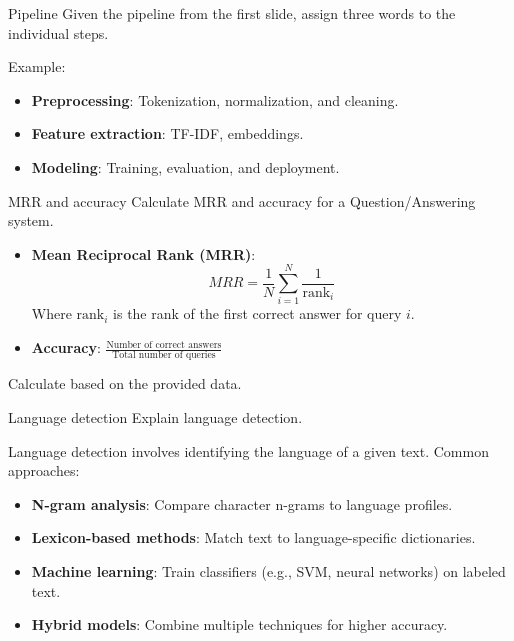 \documentclass{article}
\begin{document}
\begin{exercise}{Pipeline}
  Given the pipeline from the first slide, assign three words to the individual steps.

  \begin{solution}
    Example:
    \begin{itemize}
        \item \textbf{Preprocessing}: Tokenization, normalization, and cleaning.
        \item \textbf{Feature extraction}: TF-IDF, embeddings.
        \item \textbf{Modeling}: Training, evaluation, and deployment.
    \end{itemize}
  \end{solution}
\end{exercise}

\begin{exercise}{MRR and accuracy}
  Calculate MRR and accuracy for a Question/Answering system.

  \begin{solution}
    \begin{itemize}
        \item \textbf{Mean Reciprocal Rank (MRR)}:
        \[
        MRR = \frac{1}{N} \sum_{i=1}^{N} \frac{1}{\text{rank}_i}
        \]
        Where \(\text{rank}_i\) is the rank of the first correct answer for query \(i\).
        \item \textbf{Accuracy}: \(\frac{\text{Number of correct answers}}{\text{Total number of queries}}\)
    \end{itemize}
    Calculate based on the provided data.
  \end{solution}
\end{exercise}

\begin{exercise}{Language detection}
  Explain language detection.

  \begin{solution}
    Language detection involves identifying the language of a given text. Common approaches:
    \begin{itemize}
        \item \textbf{N-gram analysis}: Compare character n-grams to language profiles.
        \item \textbf{Lexicon-based methods}: Match text to language-specific dictionaries.
        \item \textbf{Machine learning}: Train classifiers (e.g., SVM, neural networks) on labeled text.
        \item \textbf{Hybrid models}: Combine multiple techniques for higher accuracy.
    \end{itemize}
  \end{solution}
\end{exercise}
\end{document}
